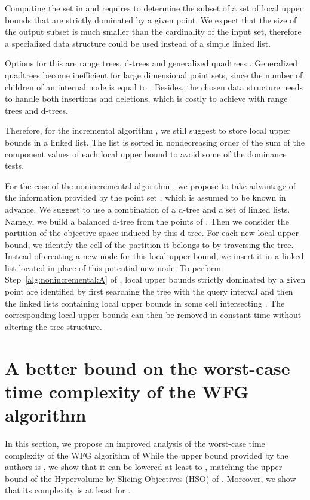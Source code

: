 \documentclass[a4paper,11pt]{article}
\begin{document}
Computing the set  in {\UBSI} and {\UBSNI}
requires to determine the subset of a set of local upper bounds that are strictly
dominated by a given point.
We expect that the size of the output subset is much smaller than the cardinality
of the input set, therefore a specialized data structure could be used instead of a simple linked list.

Options for this are range trees, d-trees and generalized quadtrees \citep{deBChevanOve08}.
Generalized quadtrees become inefficient for large dimensional point sets, since the number
of children of an internal node is equal to .
Besides, the chosen data structure needs to handle both insertions and deletions,
which is costly to achieve with range trees and d-trees.

Therefore, for the incremental algorithm {\UBSI}, we still suggest 
to store local upper bounds in a linked list. 
The list is sorted in nondecreasing order of the sum of the component values 
of each local upper bound to avoid some of the dominance tests.

For the case of the nonincremental algorithm {\UBSNI},
we propose to take advantage of the information provided 
by the point set , which is assumed to be known in advance.
We suggest to use a combination of a d-tree and a set of linked lists.
Namely, we build a balanced d-tree from the points of .
Then we consider the partition of the objective space induced by this d-tree.
For each new local upper bound, we identify the cell of the partition it belongs to
by traversing the tree. Instead of creating a new node for this local upper bound,
we insert it in a linked list located in place of this potential new node.
To perform Step~\ref{alg:nonincremental:A} of {\UBSNI},
local upper bounds strictly dominated by a given point 
are identified by first searching the tree with the query interval 
 and then the linked lists containing local upper bounds 
in some cell intersecting . 
The corresponding local upper bounds can then be removed in constant time 
without altering the tree structure.



\section{A better bound on the worst-case time complexity of the WFG algorithm}\label{sec:wfg-complexity}

In this section, we propose an improved analysis 
of the worst-case time complexity of the WFG algorithm of \citet{WhiBraBar12}
While the upper bound provided by the authors is ,
we show that it
can be lowered at least to , matching the upper bound of the  
Hypervolume by Slicing Objectives (HSO) of \citet{WhiHinBarHub06}.
Moreover, we show that its complexity is at least 
for .
\end{document}
